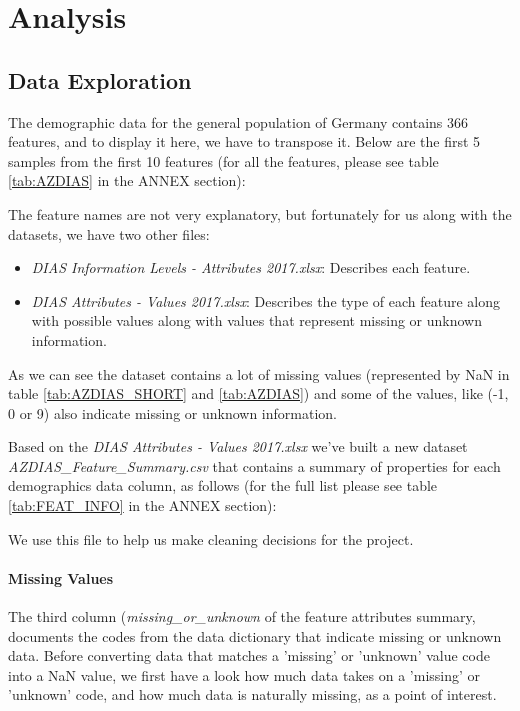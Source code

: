 \section{Analysis}

\subsection{Data Exploration}

The demographic data for the general population of Germany contains 366 features, and to display it here, we have to transpose it. Below are the first 5 samples from the first 10 features (for all the features, please see table \ref{tab:AZDIAS} in the ANNEX section):



The feature names are not very explanatory, but fortunately for us along with the datasets, we have two other files:

\begin{itemize}
\item \emph{DIAS Information Levels - Attributes 2017.xlsx}: Describes each feature.
\item \emph{DIAS Attributes - Values 2017.xlsx}: Describes the type of each feature along with possible values along with values that represent missing or unknown information.
\end{itemize}

As we can see the dataset contains a lot of missing values (represented by NaN in table \ref{tab:AZDIAS_SHORT} and \ref{tab:AZDIAS}) and some of the values, like (-1, 0 or 9) also indicate missing or unknown information.

Based on the \emph{DIAS Attributes - Values 2017.xlsx} we've built a new dataset \emph{AZDIAS\_Feature\_Summary.csv} that contains a summary of properties for each demographics data column, as follows (for the full list please see table \ref{tab:FEAT_INFO} in the ANNEX section):



We use this file to help us make cleaning decisions for the project. 

\paragraph{Missing Values} 
The third column (\emph{missing\_or\_unknown} of the feature attributes summary, documents the codes from the data dictionary that indicate missing or unknown data. Before converting data that matches a 'missing' or 'unknown' value code into a NaN value, we first have a look how much data takes on a 'missing' or 'unknown' code, and how much data is naturally missing, as a point of interest.

